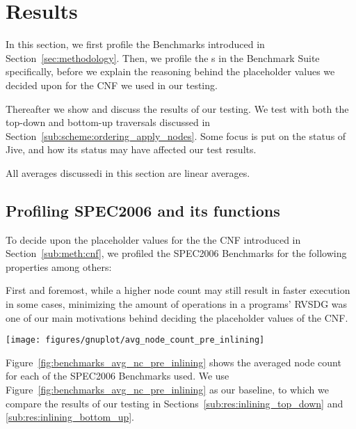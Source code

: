 
\clearpage
\section{Results}
\label{sec:res}

In this section, we first profile the Benchmarks introduced in
Section~\ref{sec:methodology}. Then, we profile the \applyNode s in the
Benchmark Suite specifically, before we explain the reasoning behind the
placeholder values we decided upon for the CNF we used in our testing.

Thereafter we show and discuss the results of our testing. We test with both the
top-down and bottom-up traversals discussed in
Section~\ref{sub:scheme:ordering_apply_nodes}. Some focus is put on the status
of Jive, and how its status may have affected our test results.

All averages discussedi in this section are linear averages.

\subsection{Profiling SPEC2006 and its functions}
\label{sub:res:profiling}

To decide upon the placeholder values for the the CNF introduced in
Section~\ref{sub:meth:cnf}, we profiled the SPEC2006 Benchmarks for the
following properties among others:

First and foremost, while a higher node count may still result in faster
execution in some cases, minimizing the amount of operations in a programs'
RVSDG was one of our main motivations behind deciding the placeholder values of
the CNF.

\begin{centering}
	\noindent\begin{minipage}{\textwidth}
		\captionsetup{type=figure}
		\hspace{-1em}
		\texttt{[image: figures/gnuplot/avg\_node\_count\_pre\_inlining]}
	\end{minipage}
	\label{fig:benchmarks_avg_nc_pre_inlining}
\end{centering}

Figure~\ref{fig:benchmarks_avg_nc_pre_inlining} shows the averaged
node count for each of the SPEC2006 Benchmarks used. We use
Figure~\ref{fig:benchmarks_avg_nc_pre_inlining} as our baseline, to which we
compare the results of our testing in Sections~\ref{sub:res:inlining_top_down}
and \ref{sub:res:inlining_bottom_up}.

